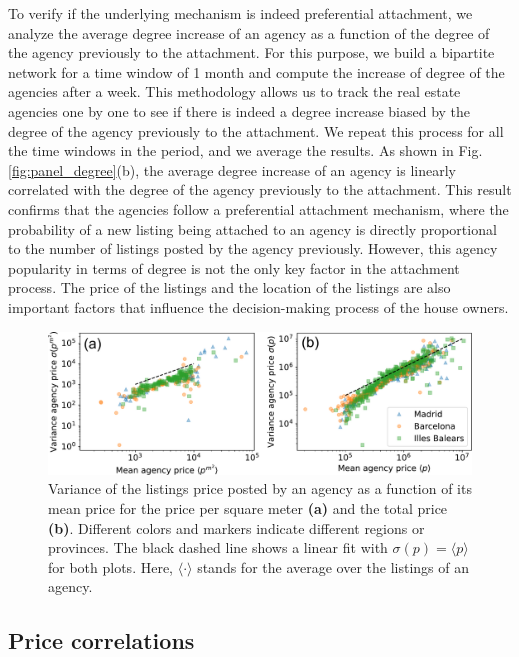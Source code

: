 To verify if the underlying mechanism is indeed preferential attachment, we analyze the average degree increase of an agency as a function of the degree of the agency previously to the attachment. For this purpose, we build a bipartite network for a time window of 1 month and compute the increase of degree of the agencies after a week. This methodology allows us to track the real estate agencies one by one to see if there is indeed a degree increase biased by the degree of the agency previously to the attachment. We repeat this process for all the time windows in the period, and we average the results. As shown in Fig. \ref{fig:panel_degree}(b), the average degree increase of an agency is linearly correlated with the degree of the agency previously to the attachment. This result confirms that the agencies follow a preferential attachment mechanism, where the probability of a new listing being attached to an agency is directly proportional to the number of listings posted by the agency previously. However, this agency popularity in terms of degree is not the only key factor in the attachment process. The price of the listings and the location of the listings are also important factors that influence the decision-making process of the house owners.

\begin{figure}
    \centering
    \includegraphics[width =\textwidth]{Figs/Idealista_dynamics/labeled_sigma_price.pdf}
	\caption[Variance of the agency price vs mean agency price.]{Variance of the listings price posted by an agency as a function of its mean price for the price per square meter \textbf{(a)} and the total price \textbf{(b)}. Different colors and markers indicate different regions or provinces. The black dashed line shows a linear fit with $\sigma(p) = \langle p \rangle$ for both plots. Here, $\langle \cdot \rangle$ stands for the average over the listings of an agency. \label{fig:sigma_price}}
\end{figure}

\subsection{Price correlations}

